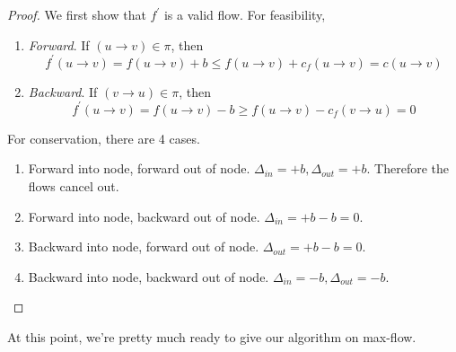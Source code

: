 \documentclass{article}
\begin{document}
    \begin{proof}
      We first show that $f^\prime$ is a valid flow. For feasibility, 
      \begin{enumerate}
        \item \textit{Forward}. If $(u \rightarrow  v) \in \pi$, then 
          \begin{equation}
            f^\prime (u \rightarrow v) = f(u \rightarrow v) + b \leq f(u \rightarrow v) + c_f (u \rightarrow v) = c(u \rightarrow v)
          \end{equation} 
        \item \textit{Backward}. If $(v \rightarrow u) \in \pi$, then 
          \begin{equation}
          f^\prime (u \rightarrow v) = f(u \rightarrow v) - b \geq f(u \rightarrow v) - c_f (v \rightarrow u) = 0 
          \end{equation}
      \end{enumerate}

      For conservation, there are 4 cases. 
      \begin{enumerate}
        \item Forward into node, forward out of node. $\Delta_{in} = +b, \Delta_{out} = +b$. Therefore the flows cancel out. 
        \item Forward into node, backward out of node. $\Delta_{in} = +b - b = 0$. 
        \item Backward into node, forward out of node. $\Delta_{out} = +b - b = 0$. 
        \item Backward into node, backward out of node. $\Delta_{in} = -b, \Delta_{out} = - b$. 
      \end{enumerate}
    \end{proof} 

    At this point, we're pretty much ready to give our algorithm on max-flow. 
\end{document}
